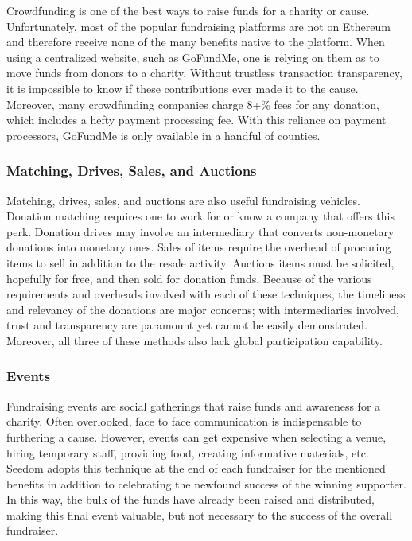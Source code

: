 \documentclass[11pt]{article}
\begin{document}
Crowdfunding is one of the best ways to raise funds for a charity or cause. Unfortunately, most of the popular fundraising platforms are not on Ethereum and therefore receive none of the many benefits native to the platform. When using a centralized website, such as GoFundMe, one is relying on them as to move funds from donors to a charity. Without trustless transaction transparency, it is impossible to know if these contributions ever made it to the cause. Moreover, many crowdfunding companies charge 8+\% fees for any donation, which includes a hefty payment processing fee. With this reliance on payment processors, GoFundMe is only available in a handful of counties.

\subsubsection{Matching, Drives, Sales, and Auctions}

Matching, drives, sales, and auctions are also useful fundraising vehicles. Donation matching requires one to work for or know a company that offers this perk. Donation drives may involve an intermediary that converts non-monetary donations into monetary ones. Sales of items require the overhead of procuring items to sell in addition to the resale activity. Auctions items must be solicited, hopefully for free, and then sold for donation funds. Because of the various requirements and overheads involved with each of these techniques, the timeliness and relevancy of the donations are major concerns; with intermediaries involved, trust and transparency are paramount yet cannot be easily demonstrated. Moreover, all three of these methods also lack global participation capability.

\subsubsection{Events}

Fundraising events are social gatherings that raise funds and awareness for a charity. Often overlooked, face to face communication is indispensable to furthering a cause. However, events can get expensive when selecting a venue, hiring temporary staff, providing food, creating informative materials, etc. Seedom adopts this technique at the end of each fundraiser for the mentioned benefits in addition to celebrating the newfound success of the winning supporter. In this way, the bulk of the funds have already been raised and distributed, making this final event valuable, but not necessary to the success of the overall fundraiser.
\end{document}
